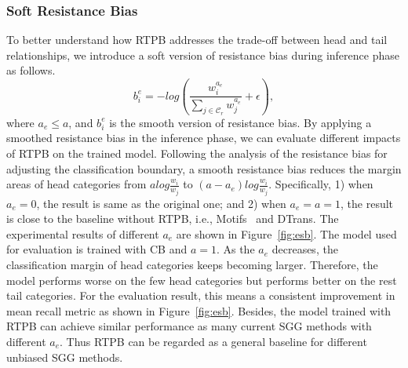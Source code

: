 \subsubsection{Soft Resistance Bias}
To better understand how RTPB addresses the trade-off between head and tail relationships, we introduce a soft version of resistance bias during inference phase as follows.
\begin{equation}
	b_i^e = -log (\frac{w_i^{a_e}}{\sum_{j \in \mathcal{C}_r} w_j^{a_e}}+ \epsilon),
\end{equation}
where $a_e \leq a$, and $b_i^e$ is the smooth version of resistance bias. By applying a smoothed resistance bias in the inference phase, we can evaluate different impacts of RTPB on the trained model. Following the analysis of the resistance bias for adjusting the classification boundary, a smooth resistance bias reduces the margin areas of head categories from $a log\frac{w_i}{w_j}$ to $(a -a_e)log\frac{w_i}{w_j}$. Specifically, 1) when $a_e= 0$, the result is same as the original one; and 2) when $a_e = a =1$, the result is close to the baseline without RTPB, i.e., Motifs~\cite{Zellers_2018_CVPR} and DTrans.
The experimental results of different $a_e$  are shown in Figure~\ref{fig:esb}. The model used for evaluation is trained with CB and $a = 1$.
As the $a_e$ decreases, the classification margin of head categories keeps becoming larger. Therefore, the model performs worse on the few head categories but performs better on the rest tail categories. For the evaluation result, this means a consistent improvement in mean recall metric as shown in Figure~\ref{fig:esb}. Besides, the model trained with RTPB can achieve similar performance as many current SGG methods with different $a_e$. Thus RTPB can be regarded as a general baseline for  different unbiased SGG methods.

